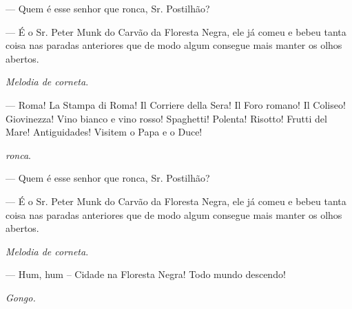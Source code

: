 \begin{myparindent}{0pt}
\begin{Parskip}
 --- Quem é esse senhor que ronca, Sr. Postilhão?

 --- É o Sr. Peter Munk do Carvão da Floresta Negra, ele já
comeu e bebeu tanta coisa nas paradas anteriores que de modo algum
consegue mais manter os olhos abertos.

\emph{Melodia de corneta}.

 --- Roma! La Stampa di Roma! Il Corriere della Sera! Il
Foro romano! Il Coliseo! Giovinezza! Vino bianco e vino rosso!
Spaghetti! Polenta! Risotto! Frutti del Mare! Antiguidades! Visitem o
Papa e o Duce!

 \emph{ronca}.

 --- Quem é esse senhor que ronca, Sr. Postilhão?

 --- É o Sr. Peter Munk do Carvão da Floresta Negra, ele já
comeu e bebeu tanta coisa nas paradas anteriores que de modo algum
consegue mais manter os olhos abertos.

\emph{Melodia de corneta}.

 --- Hum, hum -- Cidade na Floresta Negra! Todo mundo descendo!

\emph{Gongo.}


\end{Parskip}
\end{myparindent}
